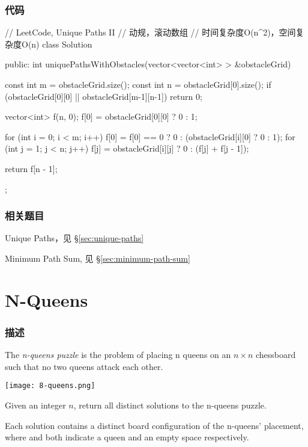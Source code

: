 \subsubsection{代码}
\begin{Code}
// LeetCode, Unique Paths II
// 动规，滚动数组
// 时间复杂度O(n^2)，空间复杂度O(n)
class Solution {
public:
    int uniquePathsWithObstacles(vector<vector<int> > &obstacleGrid) {
        const int m = obstacleGrid.size();
        const int n = obstacleGrid[0].size();
        if (obstacleGrid[0][0] || obstacleGrid[m-1][n-1]) return 0;

        vector<int> f(n, 0);
        f[0] = obstacleGrid[0][0] ? 0 : 1;

        for (int i = 0; i < m; i++) {
            f[0] = f[0] == 0 ? 0 : (obstacleGrid[i][0] ? 0 : 1);
            for (int j = 1; j < n; j++)
                f[j] = obstacleGrid[i][j] ? 0 : (f[j] + f[j - 1]);
        }

        return f[n - 1];
    }
};
\end{Code}


\subsubsection{相关题目}
\begindot
\item Unique Paths，见 \S \ref{sec:unique-paths}
\item Minimum Path Sum, 见 \S \ref{sec:minimum-path-sum}
\myenddot


\section{N-Queens} %
\label{sec:n-queens}


\subsubsection{描述}
The \emph{n-queens puzzle} is the problem of placing n queens on an $n \times n$ chessboard such that no two queens attack each other.

\begin{center}
\texttt{[image: 8-queens.png]}\\
\label{fig:8-queens}
\end{center}

Given an integer $n$, return all distinct solutions to the n-queens puzzle.

Each solution contains a distinct board configuration of the n-queens' placement, where  and  both indicate a queen and an empty space respectively.

